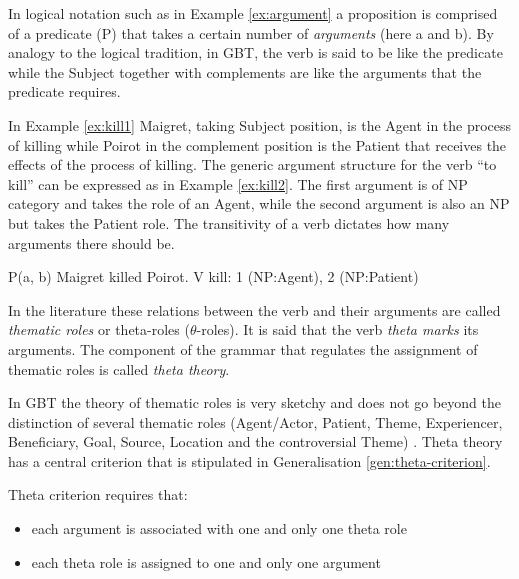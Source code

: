     In logical notation such as in Example \ref{ex:argument} a proposition is comprised of a predicate (P) that takes a certain number of \textit{arguments} (here a and b). By analogy to the logical tradition, in GBT, the verb is said to be like the predicate while the Subject together with complements are like the arguments that the predicate requires. 

    In Example \ref{ex:kill1} Maigret, taking Subject position, is the Agent in the process of killing while Poirot in the complement position is the Patient that receives the effects of the process of killing. The generic argument structure for the verb ``to kill'' can be expressed as in Example \ref{ex:kill2}. The first argument is of NP category and takes the role of an Agent, while the second argument is also an NP but takes the Patient role. The transitivity of a verb dictates how many arguments there should be.

    \begin{exe}
        \ex\label{ex:argument} P(a, b)
        \ex\label{ex:kill1} Maigret killed Poirot.
        \ex\label{ex:kill2} V kill: 1 (NP:Agent), 2 (NP:Patient)
    \end{exe}

    In the literature these relations between the verb and their arguments are called \textit{thematic roles} or theta-roles ($\theta$-roles). It is said that the verb \textit{theta marks} its arguments. The component of the grammar that regulates the assignment of thematic roles is called \textit{theta theory}. 

    In GBT the theory of thematic roles is very sketchy and does not go beyond the distinction of several thematic roles (Agent/Actor, Patient, Theme, Experiencer, Beneficiary, Goal, Source, Location and the controversial Theme) \citep[50]{Haegeman1991}. Theta theory has a central criterion that is stipulated in Generalisation \ref{gen:theta-criterion}.

    \begin{generalization}\label{gen:theta-criterion}
        Theta criterion requires that: 
        \begin{itemize}
            \item each argument is associated with one and only one theta role
            \item each theta role is assigned to one and only one argument \citep[54]{Haegeman1991}
        \end{itemize} 
    \end{generalization}

